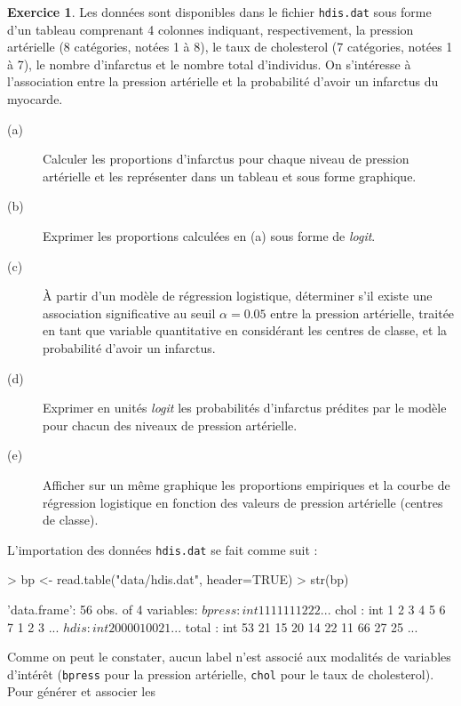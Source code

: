 \documentclass[11pt]{report}
\makeatletter
\theoremstyle{definition}
\newtheorem{exo}{Exercice}[chapter]
\newcommand{\foo}[1]{\texttt{#1}}
\newcommand{\cmd}[1]{\index{#1@\foo{#1}}}
\makeatother
\begin{document}
\begin{exo}
Les données sont disponibles dans le fichier \texttt{hdis.dat} sous forme
d'un tableau comprenant 4 colonnes indiquant, respectivement, la pression
artérielle (8 catégories, notées 1 à 8), le taux de cholesterol (7
catégories, notées 1 à 7), le nombre d'infarctus et le nombre total
d'individus. On s'intéresse à l'association entre la pression artérielle et
la probabilité d'avoir un infarctus du myocarde.
\begin{description}
\item[(a)] Calculer les proportions d'infarctus pour chaque niveau de
  pression artérielle et les représenter dans un tableau et sous forme
  graphique.
\item[(b)] Exprimer les proportions calculées en (a) sous forme de
  \emph{logit}. 
\item[(c)] À partir d'un modèle de régression logistique, déterminer s'il
  existe une association significative au seuil $\alpha=0.05$ entre la
  pression artérielle, traitée en tant que variable quantitative en
  considérant les centres de classe, et la probabilité d'avoir un
  infarctus.
\item[(d)] Exprimer en unités \emph{logit} les probabilités d'infarctus
  prédites par le modèle pour chacun des niveaux de pression artérielle.
\item[(e)] Afficher sur un même graphique les proportions empiriques et la
  courbe de régression logistique en fonction des valeurs de pression
  artérielle (centres de classe).
\end{description}
\begin{sol}
L'importation des données \texttt{hdis.dat} se fait comme suit :
\begin{Schunk}
\begin{Sinput}
> bp <- read.table("data/hdis.dat", header=TRUE)
> str(bp)
\end{Sinput}
\begin{Soutput}
'data.frame':	56 obs. of  4 variables:
 $ bpress: int  1 1 1 1 1 1 1 2 2 2 ...
 $ chol  : int  1 2 3 4 5 6 7 1 2 3 ...
 $ hdis  : int  2 0 0 0 0 1 0 0 2 1 ...
 $ total : int  53 21 15 20 14 22 11 66 27 25 ...
\end{Soutput}
\end{Schunk}
\cmd{read.table}\cmd{str}
Comme on peut le constater, aucun label n'est associé aux modalités de
variables d'intérêt (\texttt{bpress} pour la pression artérielle,
\texttt{chol} pour le taux de cholesterol). Pour générer et associer les

\end{sol}
\end{exo}
\end{document}
